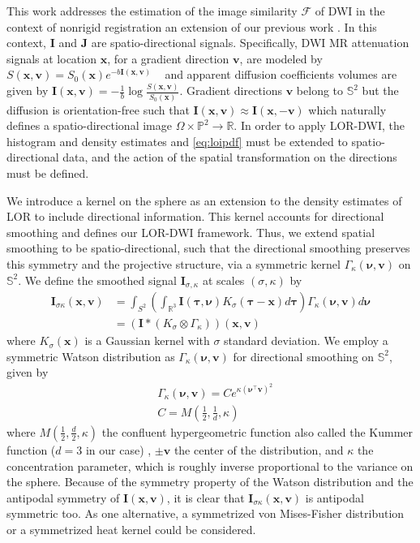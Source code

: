 \documentclass[twocolumn]{svjour3}
\begin{document}
This work addresses the estimation of the image similarity $\mathcal F$ of DWI in the
context of nonrigid registration an extension of our previous work
\cite{jensen2015locally}.
In this context, $\bm I$ and $\bm J$ are spatio-directional signals. Specifically, DWI MR
attenuation signals at location $\bm x$, for a gradient direction $\bm v$, are modeled by
$S(\bm x,\bm v) = S_0(\bm x) e^{-b\bm I(\bm x,\bm v)}$ \ \cite{tao2006method} and apparent
diffusion coefficients volumes are given by
$\bm I(\bm x,\bm v)=-\frac{1}{b}\log\frac{S(\bm x,\bm v)}{S_0(\bm x)}$. Gradient
directions $\bm v$ belong to $\mathbb S^2$ but the diffusion is orientation-free such that
$\bm I(\bm x,\bm v)\approx \bm I(\bm x,-\bm v)$ which naturally defines a
spatio-directional image $\Omega\times \mathbb P^2 \to \mathbb R$.  In order to apply
LOR-DWI, the histogram and density estimates  and \cref{eq:loipdf} must be
extended to spatio-directional data, and the action of the spatial transformation on the
directions must be defined.

We introduce a kernel on the sphere as an extension to the density estimates of LOR to
include directional information. This kernel accounts for directional smoothing and
defines our LOR-DWI framework.  Thus, we extend spatial smoothing to be
spatio-directional, such that the directional smoothing preserves this symmetry and the
projective structure, via a symmetric kernel $\Gamma_\kappa(\bm \nu,\bm v)$ on
$\mathbb{S}^2$. We define the smoothed signal $\bm I_{\sigma,\kappa}$ at scales
$(\sigma,\kappa)$ by
\begin{align}
  \bm I_{\sigma\kappa}(\bm x,\bm v)&=\label{eq:vecfieldsmooth}
      \int_{S^2} \left( \int_{\mathbb R^3} \bm I(\bm \tau,\bm \nu)K_\sigma(\bm \tau-\bm x)d\bm \tau\right) 
     \Gamma_{\kappa}(\bm \nu, \bm v) d\bm \nu\nonumber\\&=(\bm I*(K_{\sigma}\otimes \Gamma_{\kappa}))(\bm x,\bm v)
\end{align}
where $K_\sigma(\bm x)$ is a Gaussian kernel with $\sigma$ standard deviation.  We employ
a symmetric Watson distribution \cite{jupp1989unified} as $\Gamma_{\kappa}(\bm \nu,\bm v)$
for directional smoothing on $\mathbb S^2$, given by
\begin{align}
&\Gamma_\kappa(\bm \nu,\bm v)=Ce^{\kappa({\bm \nu}^\top \bm v)^2}\\ &C=M(\frac{1}{2},\frac{1}{d},\kappa)
\end{align}
where $M(\frac12,\frac{d}2,\kappa)$ the confluent hypergeometric function also called the
Kummer function ($d=3$ in our case) \cite{AbramowitzStegun1974}, $\pm\bm v$ the center of
the distribution, and $\kappa$ the concentration parameter, which is roughly inverse
proportional to the variance on the sphere. Because of the symmetry property of the Watson
distribution and the antipodal symmetry of $\bm I(\bm x,\bm v)$, it is clear that
$\bm I_{\sigma\kappa}(\bm x,\bm v)$ is antipodal symmetric too. As one alternative, a
symmetrized von Mises-Fisher \cite{jupp1989unified} distribution or a symmetrized heat
kernel could be considered.
\end{document}
